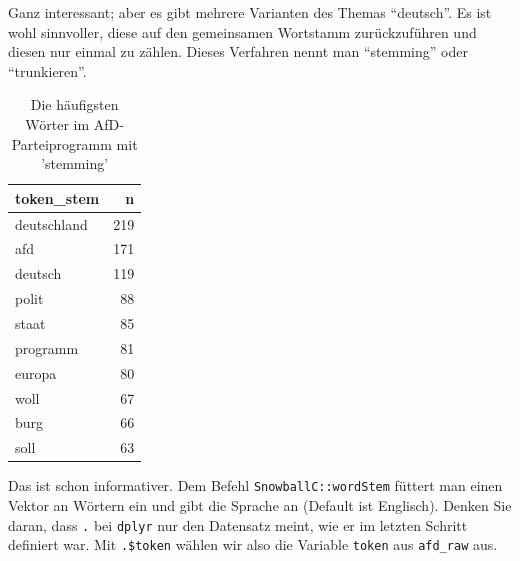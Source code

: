 \documentclass[12pt,ngerman,]{book}
\makeatletter
\newenvironment{Shaded}{\begin{snugshade}}{\end{snugshade}}
\newcommand{\KeywordTok}[1]{\textcolor[rgb]{0.13,0.29,0.53}{\textbf{{#1}}}}
\newcommand{\DataTypeTok}[1]{\textcolor[rgb]{0.13,0.29,0.53}{{#1}}}
\newcommand{\DecValTok}[1]{\textcolor[rgb]{0.00,0.00,0.81}{{#1}}}
\newcommand{\StringTok}[1]{\textcolor[rgb]{0.31,0.60,0.02}{{#1}}}
\newcommand{\OtherTok}[1]{\textcolor[rgb]{0.56,0.35,0.01}{{#1}}}
\newcommand{\NormalTok}[1]{{#1}}
\newenvironment{kframe}{%
\medskip{}
\setlength{\fboxsep}{.8em}
 \def\at@end@of@kframe{}%
 \ifinner\ifhmode%
  \def\at@end@of@kframe{\end{minipage}}%
  \begin{minipage}{\columnwidth}%
 \fi\fi%
 \def\FrameCommand##1{\hskip\@totalleftmargin \hskip-\fboxsep
 \colorbox{shadecolor}{##1}\hskip-\fboxsep
     \hskip-\linewidth \hskip-\@totalleftmargin \hskip\columnwidth}%
 \MakeFramed {\advance\hsize-\width
   \@totalleftmargin\z@ \linewidth\hsize
   \@setminipage}}%
 {\par\unskip\endMakeFramed%
 \at@end@of@kframe}
\renewenvironment{Shaded}{\begin{kframe}}{\end{kframe}}
\theoremstyle{definition}
\theoremstyle{definition}
\theoremstyle{remark}
\makeatother
\begin{document}
Ganz interessant; aber es gibt mehrere Varianten des Themas ``deutsch''.
Es ist wohl sinnvoller, diese auf den gemeinsamen Wortstamm
zurückzuführen und diesen nur einmal zu zählen. Dieses Verfahren nennt
man ``stemming'' oder ``trunkieren''.

\begin{Shaded}
\end{Shaded}

\begin{table}

\caption{\label{tab:unnamed-chunk-17}Die häufigsten Wörter im AfD-Parteiprogramm mit 'stemming'}
\centering
\begin{tabular}[t]{l|r}
\hline
token\_stem & n\\
\hline
deutschland & 219\\
\hline
afd & 171\\
\hline
deutsch & 119\\
\hline
polit & 88\\
\hline
staat & 85\\
\hline
programm & 81\\
\hline
europa & 80\\
\hline
woll & 67\\
\hline
burg & 66\\
\hline
soll & 63\\
\hline
\end{tabular}
\end{table}

Das ist schon informativer. Dem Befehl \texttt{SnowballC::wordStem}
füttert man einen Vektor an Wörtern ein und gibt die Sprache an (Default
ist Englisch). Denken Sie daran, dass \texttt{.} bei \texttt{dplyr} nur
den Datensatz meint, wie er im letzten Schritt definiert war. Mit
\texttt{.\$token} wählen wir also die Variable \texttt{token} aus
\texttt{afd\_raw} aus.
\end{document}
